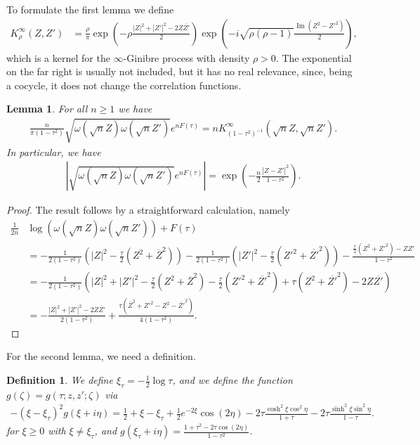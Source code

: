 \documentclass[%
 jmp,
cp,  %
 amsmath,amsthm,amssymb,%
 reprint,%
onecolumn]{revtex4-2}
\newtheorem{lemma}[theorem]{Lemma}
\newtheorem{definition}[theorem]{Definition}
\begin{document}
To formulate the first lemma we define
\begin{align*}
K_{\rho}^{\infty}(Z,Z') &= \frac{\rho}{\pi} \exp\left(-\rho \frac{|Z|^2+|Z'|^2-2 Z \overline{Z'}}{2}\right)
\exp\left(- i \sqrt{\rho(\rho-1)} \frac{\operatorname{Im}(Z^2-Z'^2)}{2}\right),
\end{align*}
which is a kernel for the $\infty$-Ginibre process with density $\rho>0$. The exponential on the far right is usually not included, but it has no real relevance, since, being a cocycle, it does not change the correlation functions.
\begin{lemma} \label{prop:valueomegaWZeFtau}
For all $n\geq 1$ we have
\begin{align} \label{eq:valueomegaWZeFtau}
\frac{n}{\pi(1-\tau^2)}\sqrt{\omega\left(\sqrt n Z\right) \omega\left(\sqrt n Z'\right)} e^{n F(\tau)}
=   n K_{(1-\tau^2)^{-1}}^{\infty}\left(\sqrt n Z, \sqrt n Z'\right).
\end{align}
In particular, we have
\begin{align} \label{eq:weightsFtauGaussian}
\left|\sqrt{\omega\left(\sqrt n Z\right) \omega\left(\sqrt n Z'\right)} e^{n F(\tau)}\right| = \exp\left(-\frac{n}{2} \frac{|Z-Z'|^2}{1-\tau^2}\right).
\end{align}
\end{lemma}

\begin{proof}
The result follows by a straightforward calculation, namely
\begin{align*}
\frac{1}{2 n} & \log (\omega\left(\sqrt n Z\right) \omega\left(\sqrt n Z'\right)) + F(\tau)\\
&= -\frac{1}{2(1-\tau^2)} \left(|Z|^2 - \frac{\tau}{2} (Z^2+\overline{Z}^2)\right)
 -\frac{1}{2(1-\tau^2)} \left(|Z'|^2 - \frac{\tau}{2} (Z'^2+\overline{Z'}^2)\right)
 - \frac{\frac{\tau}{2} (Z^2+Z'^2) -  
 ZZ'}{1-\tau^2}\\
&= -\frac{1}{2(1-\tau^2)} \left(|Z|^2+|Z'|^2 - \frac{\tau}{2} (Z^2+\overline{Z}^2)- \frac{\tau}{2} (Z'^2+\overline{Z'}^2)+\tau (Z^2+\overline{Z'}^2) -  2 Z \overline{Z'}\right)\\
 &= -\frac{|Z|^2+|Z'|^2-2 Z \overline{Z'}}{2(1-\tau^2)}+\frac{\tau (\overline{Z}^2+Z'^2 - Z^2 - \overline{Z'}^2)}{4(1-\tau^2)}.
\end{align*}
\end{proof}
For the second lemma, we need a definition.
\begin{definition}
We define $\xi_\tau = -\frac{1}{2} \log\tau$, and we define the function $g(\zeta) = g(\tau;z,z';\zeta)$ via
\begin{align} \label{eq:defpthetas}
-(\xi - \xi_\tau)^2 g(\xi+i\eta) =  \frac{1}{2} +\xi -\xi_\tau + \frac{1}{2} e^{-2\xi} \cos(2\eta)
- 2\tau \frac{\cosh^2 \xi \cos^2 \eta}{1+\tau} 
- 2\tau \frac{\sinh^2 \xi \sin^2 \eta}{1-\tau}.
\end{align}
for $\xi\geq 0$ with $\xi\neq \xi_\tau$, and $g\left(\xi_\tau+i\eta\right) 
= \frac{1+\tau^2- 2\tau \cos(2\eta)}{1-\tau^2}$.\\
\end{definition}
\end{document}
